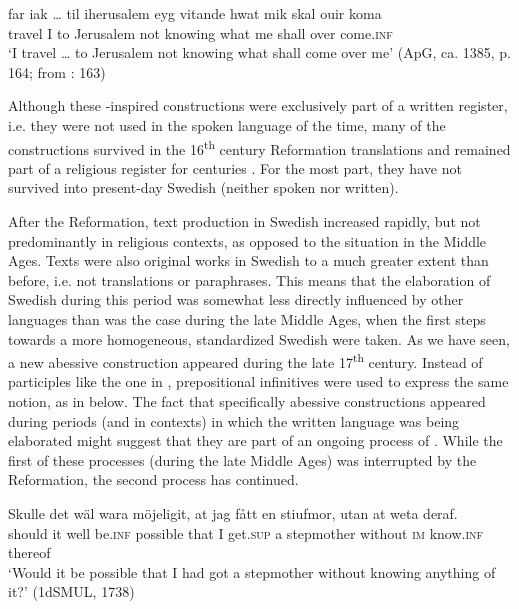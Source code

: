 \documentclass[output=paper]{langscibook}
\begin{document}
\ea 
\label{ex:kalm:33}
 \gll far {iak …} til iherusalem eyg vitande hwat mik skal ouir koma\\ 
travel I to Jerusalem not knowing what me shall over come.\textsc{inf}\\
 \glt ‘I travel … to Jerusalem not knowing what shall come over me’ (ApG, ca. 1385, p. 164; from \citealt{Ahlberg1942}: 163)
\z


Although these -inspired constructions were exclusively part of a written register, i.e. they were not used in the spoken language of the time, many of the  constructions survived in the 16\textsuperscript{th} century Reformation  translations and remained part of a religious register for centuries \citep[17–19]{Stahle1970}. For the most part, they have not survived into present-day Swedish (neither spoken nor written). 

After the Reformation, text production in Swedish increased rapidly, but not predominantly in religious contexts, as opposed to the situation in the Middle Ages. Texts were also original works in Swedish to a much greater extent than before, i.e. not translations or paraphrases. This means that the elaboration of Swedish during this period was somewhat less directly influenced by other languages than was the case during the late Middle Ages, when the first steps towards a more homogeneous, standardized Swedish were taken. As we have seen, a new abessive construction appeared during the late 17\textsuperscript{th} century. Instead of participles like the one in , prepositional infinitives were used to express the same  notion, as in  below. The fact that specifically abessive constructions appeared during periods (and in contexts) in which the written language was being elaborated might suggest that they are part of an ongoing process of . While the first of these processes (during the late Middle Ages) was interrupted by the Reformation, the second process has continued. 


\ea
\label{ex:kalm:34}
 \gll Skulle det wäl wara möjeligit, at jag fått en stiufmor, utan at weta deraf.\\
should it well be.\textsc{inf} possible that I get.\textsc{sup} a stepmother without \textsc{im} know.\textsc{inf} thereof\\
\glt ‘Would it be possible that I had got a stepmother without knowing anything of it?’ (1dSMUL, 1738)
\z
\end{document}
